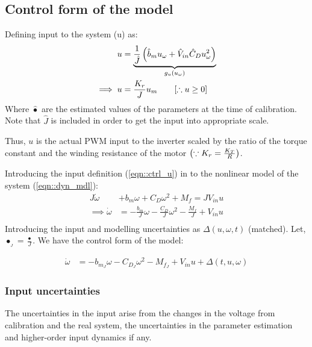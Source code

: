 \subsection{Control form of the model}

Defining input to the system (u) as:
\begin{align}
    u &= \underbrace{\frac{1}{\hat J}\left( \hat b_m u_\omega + \hat V_{in} \hat C_D u_\omega ^2 \right)}_{g_u(u_\omega)} \label{eqn::uw2u}\\
    \implies u &= \frac{K_r}{J} u_m \qquad [\therefore u \geq 0] \label{eqn::ctrl_u}
\end{align}
Where $\hat \bullet$ are the estimated values of the parameters at the time of
calibration. Note that $\hat J$ is included in order to get the input into
appropriate scale.

Thus, $u$ is the actual PWM input to the inverter scaled by the ratio of the
torque constant and the winding resistance of the motor $\left( \because K_r =
\frac{K_T}{R} \right)$.

Introducing the input definition (\ref{eqn::ctrl_u}) in to the nonlinear model
of the system (\ref{eqn::dyn_mdl}):
\begin{align*}
    J\dot \omega &+ b_m \omega + C_D \omega^2 + M_f = J V_{in} u\\
    \implies \dot \omega  &= -\frac{b_m}{J} \omega - \frac{C_D}{J} \omega^2 - \frac{M_f}{J} + V_{in} u\\
\end{align*}
Introducing the input and modelling uncertainties as $\Delta(u, \omega, t)$ (matched). Let,
$\bullet_{_J} = \frac{\bullet}{J}$. We have the control form of the model:

\begin{align}
   \dot \omega &= -b_{m_J} \omega - C_{D_J} \omega^2 - M_{f_J} + V_{in} u + \Delta(t, u, \omega) \label{eqn::ctrl_form}
\end{align}

\subsubsection{Input uncertainties}
The uncertainties in the input arise from the changes in the voltage from
calibration and the real system, the uncertainties in the parameter estimation
and higher-order input dynamics if any.

